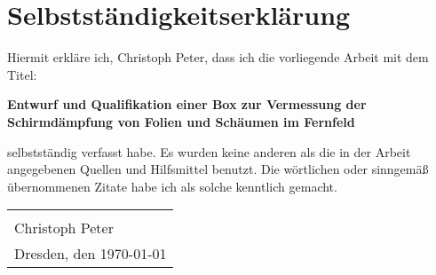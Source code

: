 \chapter*{Selbstständigkeitserklärung}
\thispagestyle{empty}

\vspace*{2cm}

\begin{large}
Hiermit erkläre ich, Christoph Peter, dass ich die vorliegende Arbeit mit dem Titel: \par
\vspace{1cm}
\begin{center}
    \Large \textbf{Entwurf und Qualifikation einer Box zur Vermessung der Schirmdämpfung von Folien und
Schäumen im Fernfeld} \par
\end{center} 
\vspace{1cm}
\noindent selbstständig verfasst habe. Es wurden keine anderen als die in der Arbeit angegebenen Quellen und \linebreak Hilfsmittel benutzt. Die wörtlichen oder sinngemäß übernommenen Zitate habe ich als solche \linebreak kenntlich gemacht.

\vspace{3cm}

\begin{tabular}{p{6cm}}
    \dotfill \\
    Christoph Peter \\[3cm]
    Dresden, den \today
\end{tabular}

\end{large}